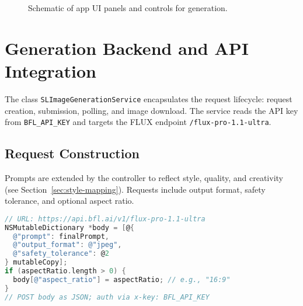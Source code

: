 \begin{figure}[H]
\centering
{}
\caption{Schematic of app UI panels and controls for generation.}
\label{fig:ui-layout}
\end{figure}

\section{Generation Backend and API Integration}
The class \texttt{SLImageGenerationService} encapsulates the request lifecycle: request creation, submission, polling, and image download. The service reads the API key from \texttt{BFL\_API\_KEY} and targets the FLUX endpoint \texttt{/flux-pro-1.1-ultra}.

\subsection{Request Construction}
Prompts are extended by the controller to reflect style, quality, and creativity (see Section~\ref{sec:style-mapping}). Requests include output format, safety tolerance, and optional aspect ratio.

\begin{lstlisting}[language=C, basicstyle=\ttfamily\small, caption={Core generation request (abridged).}, label={lst:request}]
// URL: https://api.bfl.ai/v1/flux-pro-1.1-ultra
NSMutableDictionary *body = [@{
  @"prompt": finalPrompt,
  @"output_format": @"jpeg",
  @"safety_tolerance": @2
} mutableCopy];
if (aspectRatio.length > 0) {
  body[@"aspect_ratio"] = aspectRatio; // e.g., "16:9"
}
// POST body as JSON; auth via x-key: BFL_API_KEY
\end{lstlisting}

